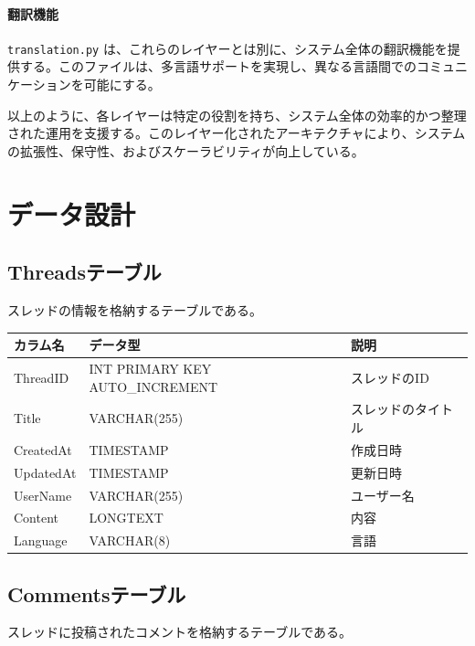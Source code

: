 \documentclass[b5paper,12pt]{jsreport}
\begin{document}
\paragraph{翻訳機能}
\texttt{translation.py} は、これらのレイヤーとは別に、システム全体の翻訳機能を提供する。このファイルは、多言語サポートを実現し、異なる言語間でのコミュニケーションを可能にする。

以上のように、各レイヤーは特定の役割を持ち、システム全体の効率的かつ整理された運用を支援する。このレイヤー化されたアーキテクチャにより、システムの拡張性、保守性、およびスケーラビリティが向上している。


\section{データ設計}

\subsection*{Threadsテーブル}

スレッドの情報を格納するテーブルである。

\begin{adjustbox}{width=\textwidth,center}
	\begin{tabular}{lll}
	\toprule
	\textbf{カラム名} & \textbf{データ型} & \textbf{説明} \\
	\midrule
	ThreadID   & INT PRIMARY KEY AUTO\_INCREMENT & スレッドのID \\
	Title      & VARCHAR(255) & スレッドのタイトル \\
	CreatedAt  & TIMESTAMP & 作成日時 \\
	UpdatedAt  & TIMESTAMP & 更新日時 \\
	UserName   & VARCHAR(255) & ユーザー名 \\
	Content    & LONGTEXT & 内容 \\
	Language   & VARCHAR(8) & 言語 \\
	\bottomrule
	\end{tabular}
\end{adjustbox}

\subsection*{Commentsテーブル}

スレッドに投稿されたコメントを格納するテーブルである。
\end{document}
